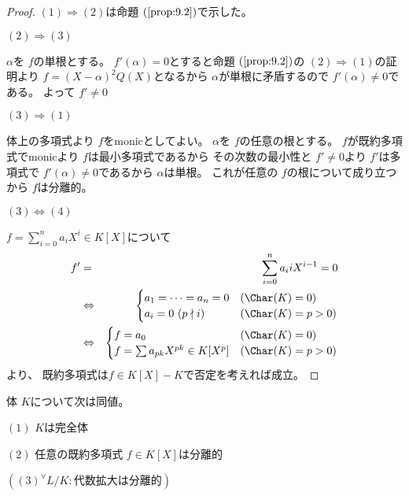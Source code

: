 \documentclass[../master_galois_theory]{subfiles}
\begin{document}
\begin{proof}
  $(1) \Rightarrow (2)$は命題 $(\mathrm{\ref{prop:9.2}})$で示した。

  $(2) \Rightarrow (3)$

  $\alpha$を $f$の単根とする。
  $f'(\alpha) = 0$とすると命題 $(\mathrm{\ref{prop:9.2}})$の $(2) \Rightarrow (1)$の証明より
  $f = (X - \alpha)^2 Q(X)$となるから $\alpha$が単根に矛盾するので $f'(\alpha) \neq 0$である。
  よって $f' \neq 0$

  $(3) \Rightarrow (1)$

  体上の多項式より $f$を\rm{monic}としてよい。
  $\alpha$を $f$の任意の根とする。
  $f$が既約多項式で\rm{monic}より $f$は最小多項式であるから
  その次数の最小性と $f' \neq 0$より
  $f'$は多項式で $f'(\alpha) \neq 0$であるから $\alpha$は単根。
  これが任意の $f$の根について成り立つから $f$は分離的。

  $(3) \Leftrightarrow (4)$

  $f = \sum_{i=0}^n a_i X^i \in K[X]$について
  \begin{eqnarray*}
    f' & = & \sum_{i=0}^n a_i i X^{i-1} = 0 \\
    & \Leftrightarrow &
     \begin{cases}
      a_1 = \cdots = a_n = 0 & (\Char(K) = 0) \\
      a_i = 0 \  (p \nmid i) & (\Char(K) = p > 0)
     \end{cases} \\
    & \Leftrightarrow &
    \begin{cases}
      f = a_0 & (\Char(K) = 0) \\
      f = \sum a_{pk} X^{pk} \in K[X^p] & (\Char(K) = p > 0)
    \end{cases}
  \end{eqnarray*}
  より、 既約多項式は$f \in K[X]-K$で否定を考えれば成立。
\end{proof}

\begin{corl} \label{corl:9.4}
  体 $K$について次は同値。

  $(1)$
  $K$は完全体

  $(2)$
  任意の既約多項式 $f \in K[X]$は分離的

  $((3) {}^\forall L/K:代数拡大は分離的)$
\end{corl}
\end{document}
